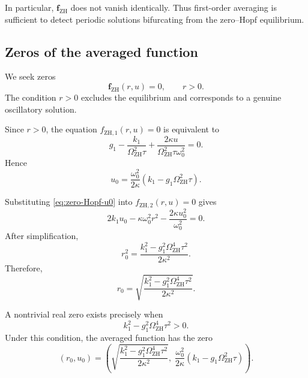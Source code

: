 \documentclass[11pt,reqno]{amsart}
\theoremstyle{plain}
\theoremstyle{definition}
\theoremstyle{remark}
\begin{document}
In particular, \(\mathbf f_{\mathrm{ZH}}\) does not vanish identically.
Thus first-order averaging is sufficient to detect periodic solutions
bifurcating from the zero--Hopf equilibrium.

\subsection{Zeros of the averaged function}
\label{subsec:zero-Hopf-averaged-zeros}

We seek zeros
\[
\mathbf f_{\mathrm{ZH}}(r,u)=0,
\qquad
r>0.
\]
The condition \(r>0\) excludes the equilibrium and corresponds to a
genuine oscillatory solution.

Since \(r>0\), the equation
$
f_{\mathrm{ZH},1}(r,u)=0
$
is equivalent to
\[
g_1
-
\frac{k_1}{\Omega_{\mathrm{ZH}}^2\tau}
+
\frac{
2\kappa u
}{
\Omega_{\mathrm{ZH}}^2\tau\omega_0^2
}
=
0.
\]
Hence
\begin{equation}
\label{eq:zero-Hopf-u0}
u_0
=
\frac{\omega_0^2}{2\kappa}
\left(
k_1
-
g_1\Omega_{\mathrm{ZH}}^2\tau
\right).
\end{equation}

Substituting \eqref{eq:zero-Hopf-u0} into
$
f_{\mathrm{ZH},2}(r,u)=0
$
gives
\[
2k_1u_0
-
\kappa\omega_0^2r^2
-
\frac{2\kappa u_0^2}{\omega_0^2}
=
0.
\]
After simplification,
\begin{equation}
\label{eq:zero-Hopf-r0-square}
r_0^2
=
\frac{
k_1^2
-
g_1^2\Omega_{\mathrm{ZH}}^4\tau^2
}{
2\kappa^2
}.
\end{equation}
Therefore,
\begin{equation}
\label{eq:zero-Hopf-r0}
r_0
=
\sqrt{
\frac{
k_1^2
-
g_1^2\Omega_{\mathrm{ZH}}^4\tau^2
}{
2\kappa^2
}
}.
\end{equation}

A nontrivial real zero exists precisely when
\begin{equation}
\label{eq:zero-Hopf-existence-condition}
k_1^2
-
g_1^2\Omega_{\mathrm{ZH}}^4\tau^2
>0.
\end{equation}
Under this condition, the averaged function has the zero
\begin{equation}
\label{eq:zero-Hopf-averaged-zero}
(r_0,u_0)
=
\left(
\sqrt{
\frac{
k_1^2
-
g_1^2\Omega_{\mathrm{ZH}}^4\tau^2
}{
2\kappa^2
}
},
\;
\frac{\omega_0^2}{2\kappa}
\left(
k_1
-
g_1\Omega_{\mathrm{ZH}}^2\tau
\right)
\right).
\end{equation}
\end{document}
